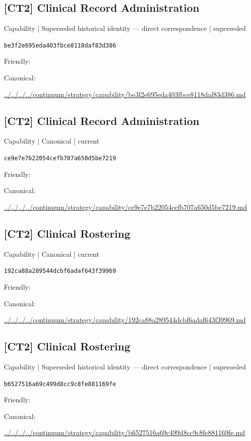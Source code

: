 \documentclass[10pt,a4paper]{article}
\begin{document}
\subsection*{[CT2] Clinical Record Administration}
{\small Capability | Superseded historical identity — direct correspondence | superseded}\par
\texttt{be3f2e695eda403fbce8118daf83d386}\par
Friendly: \par
Canonical: \par
{\footnotesize\url{../../../../continuum/strategy/capability/be3f2e695eda403fbce8118daf83d386.md}}\par
\subsection*{[CT2] Clinical Record Administration}
{\small Capability | Canonical | current}\par
\texttt{ce9e7e7b22054cefb707a650d5be7219}\par
Friendly: \par
Canonical: \par
{\footnotesize\url{../../../../continuum/strategy/capability/ce9e7e7b22054cefb707a650d5be7219.md}}\par
\subsection*{[CT2] Clinical Rostering}
{\small Capability | Canonical | current}\par
\texttt{192ca88a289544dcbf6adaf643f39969}\par
Friendly: \par
Canonical: \par
{\footnotesize\url{../../../../continuum/strategy/capability/192ca88a289544dcbf6adaf643f39969.md}}\par
\subsection*{[CT2] Clinical Rostering}
{\small Capability | Superseded historical identity — direct correspondence | superseded}\par
\texttt{b6527516a69c499d8cc9c8fe881169fe}\par
Friendly: \par
Canonical: \par
{\footnotesize\url{../../../../continuum/strategy/capability/b6527516a69c499d8cc9c8fe881169fe.md}}\par
\end{document}
